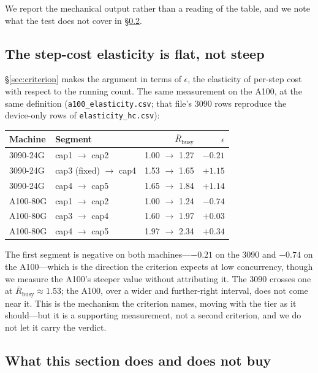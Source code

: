 We report the mechanical output rather than a reading of the table, and we
note what the test does not cover in \S\ref{sec:a100:limits}.

\subsection{The step-cost elasticity is flat, not steep}

\S\ref{sec:criterion} makes the argument in terms of $\epsilon$, the
elasticity of per-step cost with respect to the running count. The same
measurement on the A100, at the same definition (\texttt{a100\_elasticity.csv};
that file's 3090 rows reproduce the device-only rows of
\texttt{elasticity\_hc.csv}):

\begin{center}
\small
\begin{tabular}{llrr}
  \toprule
  Machine & Segment & $\overline{R}_{\text{busy}}$ & $\epsilon$ \\
  \midrule
  3090-24G & cap1 $\to$ cap2         & 1.00 $\to$ 1.27 & $-0.21$ \\
  3090-24G & cap3 (fixed) $\to$ cap4 & 1.53 $\to$ 1.65 & $+1.15$ \\
  3090-24G & cap4 $\to$ cap5         & 1.65 $\to$ 1.84 & $+1.14$ \\
  \midrule
  A100-80G & cap1 $\to$ cap2         & 1.00 $\to$ 1.24 & $-0.74$ \\
  A100-80G & cap3 $\to$ cap4         & 1.60 $\to$ 1.97 & $+0.03$ \\
  A100-80G & cap4 $\to$ cap5         & 1.97 $\to$ 2.34 & $+0.34$ \\
  \bottomrule
\end{tabular}
\end{center}

The first segment is negative on both machines---$-0.21$ on the 3090 and
$-0.74$ on the A100---which is the direction the criterion expects at low
concurrency, though we measure the A100's steeper value without attributing it.
The 3090 crosses one at $\overline{R}_{\text{busy}} \approx 1.53$; the A100,
over a wider and further-right interval, does not come near it. This is the
mechanism the criterion names, moving with the tier as it should---but it is a
supporting measurement, not a second criterion, and we do not let it carry the
verdict.

\subsection{What this section does and does not buy}
\label{sec:a100:limits}


